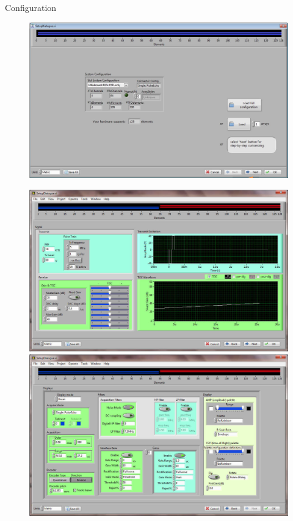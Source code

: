 \documentclass[t,12pt,english
\ifx\beamermode\undefined\else,\beamermode\fi
]{beamer}
\begin{document}
\begin{frame}{Configuration}

\begin{figure}[!htb]

\endminipage
{}
\centering
\includegraphics[width=1\textwidth]{14.png}
\endminipage
\end{figure}

\begin{figure}[!htb]
\centering
\includegraphics[width=1\textwidth]{15.png}
\endminipage
{}
\centering
\includegraphics[width=1\textwidth]{16.png}
\endminipage
\end{figure}

\end{frame}
\end{document}
